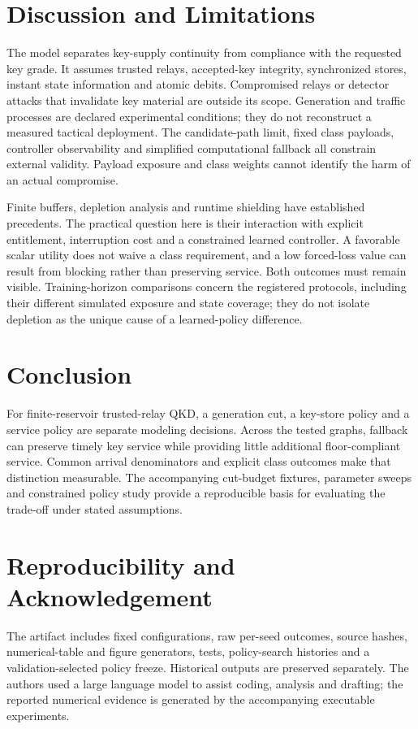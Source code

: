 \documentclass[conference,a4paper]{IEEEtran}
\begin{document}
\section{Discussion and Limitations}\label{sec:limits}
The model separates key-supply continuity from compliance with the requested key grade. It assumes trusted relays, accepted-key integrity, synchronized stores, instant state information and atomic debits. Compromised relays or detector attacks that invalidate key material are outside its scope. Generation and traffic processes are declared experimental conditions; they do not reconstruct a measured tactical deployment. The candidate-path limit, fixed class payloads, controller observability and simplified computational fallback all constrain external validity. Payload exposure and class weights cannot identify the harm of an actual compromise.

Finite buffers, depletion analysis and runtime shielding have established precedents. The practical question here is their interaction with explicit entitlement, interruption cost and a constrained learned controller. A favorable scalar utility does not waive a class requirement, and a low forced-loss value can result from blocking rather than preserving service. Both outcomes must remain visible. Training-horizon comparisons concern the registered protocols, including their different simulated exposure and state coverage; they do not isolate depletion as the unique cause of a learned-policy difference.

\section{Conclusion}
For finite-reservoir trusted-relay QKD, a generation cut, a key-store policy and a service policy are separate modeling decisions. Across the tested graphs, fallback can preserve timely key service while providing little additional floor-compliant service. Common arrival denominators and explicit class outcomes make that distinction measurable. The accompanying cut-budget fixtures, parameter sweeps and constrained policy study provide a reproducible basis for evaluating the trade-off under stated assumptions.

\section*{Reproducibility and Acknowledgement}
The artifact includes fixed configurations, raw per-seed outcomes, source hashes, numerical-table and figure generators, tests, policy-search histories and a validation-selected policy freeze. Historical outputs are preserved separately. The authors used a large language model to assist coding, analysis and drafting; the reported numerical evidence is generated by the accompanying executable experiments.
\end{document}

